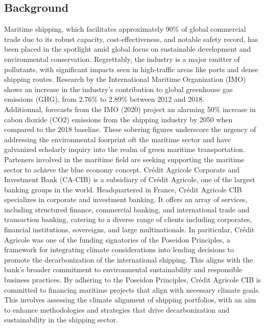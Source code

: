 \documentclass[a4paper,12pt]{article}
\begin{document}
\subsection{Background}
Maritime shipping, which facilitates approximately 90\% of global commercial trade due to its robust capacity, cost-effectiveness, and notable safety record, has been placed in the spotlight amid global focus on sustainable development and environmental conservation.
Regrettably, the industry is a major emitter of pollutants, with significant impacts seen in high-traffic areas like ports and dense shipping routes.
Research by the International Maritime Organization (IMO) shows an increase in the industry's contribution to global greenhouse gas emissions (GHG), from 2.76\% to 2.89\% between 2012 and 2018.\\

Additionnal, forecasts from the IMO (2020) project an alarming 50\% increase in cabon dioxide (CO2) emissions from the shipping industry by 2050 when compared to the 2018 baseline. These sobering figures underscore the urgency of addressing the environmental foorprint oft the maritime sector and have galvanized scholarly inquiry into the realm of green maritime transportation.\\

Parteners involved in the maritime field are seeking supporting the maritime sector to achieve the blue economy concept. Crédit Agricole Corporate and Investment Bank (CA-CIB) is a subsidiary of Crédit Agricole, one of the largest banking groups in the world.
Headquartered in France, Crédit Agricole CIB specializes in corporate and investment banking.
It offers an array of services, including structured finance, commercial banking, and international trade and transaction banking, catering to a diverse range of clients including corporates, financial institutions, sovereigns, and large multinationals.
In pariticular, Crédit Agricole was one of the funding signatories of the Poseidon Principles, a framework for integrating climate considerations into lending decisions to promote the decarbonization of the international shipping. 
This aligns with the bank's broader commitment to environmental sustainability and responsible business practices. By adhering to the Poseidon Principles, Crédit Agricole CIB is committed to financing maritime projects that align with necessary climate goals. 
This involves assessing the climate alignment of shipping portfolios, with an aim to enhance methodologies and strategies that drive decarbonization and sustainability in the shipping sector.\\
\end{document}

